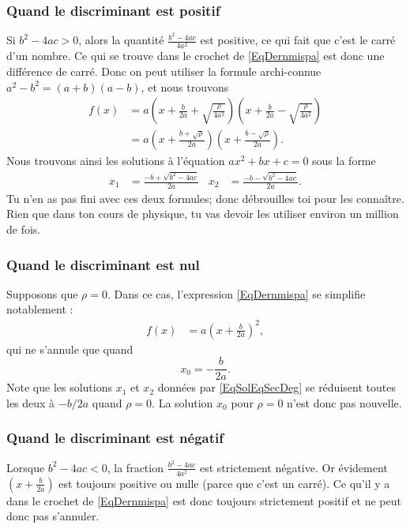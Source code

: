 \subsubsection{Quand le discriminant est positif}

Si $b^2-4ac>0$, alors la quantité $\frac{ b^2-4ac }{ 4a^2 }$ est positive, ce qui fait que c'est le carré d'un nombre. Ce qui se trouve dans le crochet de \eqref{EqDernmispa} est donc une différence de carré. Donc on peut utiliser la formule archi-connue $a^2-b^2=(a+b)(a-b)$, et nous trouvons
\begin{align*}
f(x)	&=a\left( x+\frac{ b }{ 2a }+\sqrt{\frac{\rho}{ 4a^2 }} \right)\left( x+\frac{ b }{ 2a }-\sqrt{\frac{\rho}{ 4a^2 }} \right)\\
	&=a\left( x+\frac{ b+\sqrt{\rho} }{ 2a } \right)\left( x+\frac{ b-\sqrt{\rho} }{ 2a } \right).
\end{align*}
Nous trouvons ainsi les solutions à l'équation $ax^2+bx+c=0$ sous la forme
\begin{align}		\label{EqSolEqSecDeg}
x_1&=\frac{ -b+\sqrt{b^2-4ac} }{ 2a }&x_2&=\frac{ -b-\sqrt{b^2-4ac} }{ 2a }.
\end{align}
Tu n'en as pas fini avec ces deux formules; donc débrouilles toi pour les connaître. Rien que dans ton cours de physique, tu vas devoir les utiliser environ un million de fois.

\subsubsection{Quand le discriminant est nul}

Supposons que $\rho=0$. Dans ce cas, l'expression \eqref{EqDernmispa} se simplifie notablement :
\begin{align*}
f(x)&=a\left( x+\frac{ b }{ 2a } \right)^2,
\end{align*}
qui ne s'annule que quand 
\[ 
  x_0=-\frac{ b }{ 2a }.
\]
Note que les solutions $x_1$ et $x_2$ données par \eqref{EqSolEqSecDeg} se réduisent toutes les deux à $-b/2a$ quand $\rho=0$. La solution $x_0$ pour $\rho=0$ n'est donc pas nouvelle.

\subsubsection{Quand le discriminant est négatif}

Lorsque $b^2-4ac<0$, la fraction $\frac{ b^2-4ac }{ 4a^2 }$ est strictement négative. Or évidement $\left( x+\frac{ b }{ 2a } \right)$ est toujours positive ou nulle (parce que c'est un carré). Ce qu'il y a dans le crochet de \eqref{EqDernmispa} est donc toujours strictement positif et ne peut donc pas s'annuler. 

